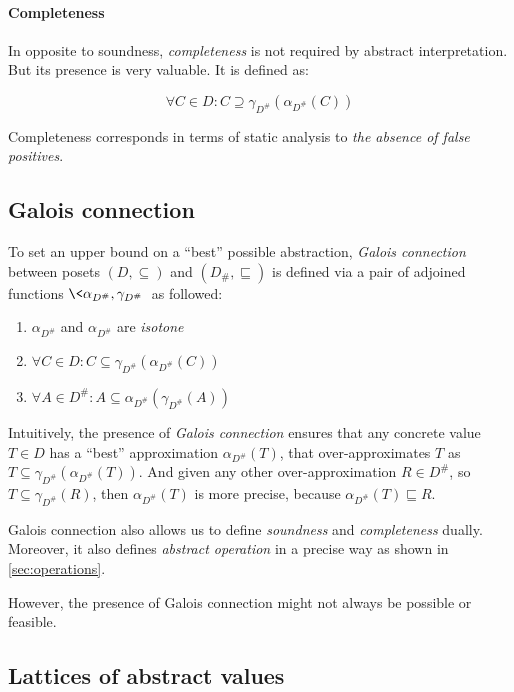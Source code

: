 \documentclass[12pt,oneside]{fithesis2}
\theoremstyle{definition}
\begin{document}
\paragraph{Completeness}
In opposite to soundness, \textit{completeness} is not required by abstract interpretation. But its presence is very valuable. It is defined as: \cite{mine-AIAA10}

\[
  \forall C \in D: C \supseteq \gamma_{D^\#}(\alpha_{D^\#}(C))
\]

Completeness corresponds in terms of static analysis to \textit{the absence of false positives}.

\subsection{Galois connection}

To set an upper bound on a ``best'' possible abstraction\cite{mine-AIAA10}, \textit{Galois connection}  between posets $(D, \subseteq)$ and $(D_\#, \sqsubseteq)$ is defined via a pair of adjoined functions $\< \alpha_{D^\#}, \gamma_{D^\#} \>$ as followed: \cite{CousotCousot79-1}

\begin{enumerate}
  \item $\alpha_{D^\#}$ and $\alpha_{D^\#}$ are \textit{isotone}
  \item $\forall C \in D: C \subseteq \gamma_{D^\#}(\alpha_{D^\#}(C))$
  \item $\forall A \in D^\#: A \subseteq \alpha_{D^\#}(\gamma_{D^\#}(A))$
\end{enumerate}

Intuitively, the presence of \textit{Galois connection} ensures that any concrete value $T \in D$ has a ``best'' approximation $\alpha_{D^\#}(T)$, that over-approximates $T$ as $T \subseteq \gamma_{D^\#}(\alpha_{D^\#}(T))$. And given any other over-approximation $R \in D^\#$, so $T \subseteq \gamma_{D^\#}(R)$, then $\alpha_{D^\#}(T)$ is more precise, because $\alpha_{D^\#}(T) \sqsubseteq R$.

Galois connection also allows us to define \textit{soundness} and \textit{completeness} dually. Moreover, it also defines \textit{abstract operation} in a precise way as shown in \ref{sec:operations}.

However, the presence of Galois connection might not always be possible or feasible.

\subsection{Lattices of abstract values}
\end{document}
